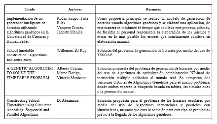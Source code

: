 \begin{itemize}
		\begin{figure}[htbp!]
			\begin{center}
				\includegraphics[width=1.05\textwidth]{images/entornoTT/estadoArteTesis.png}
				
			\end{center}
		\end{figure}
	\end{itemize}
		
%		
%		
%			
%			
	
	


	
	
	
	